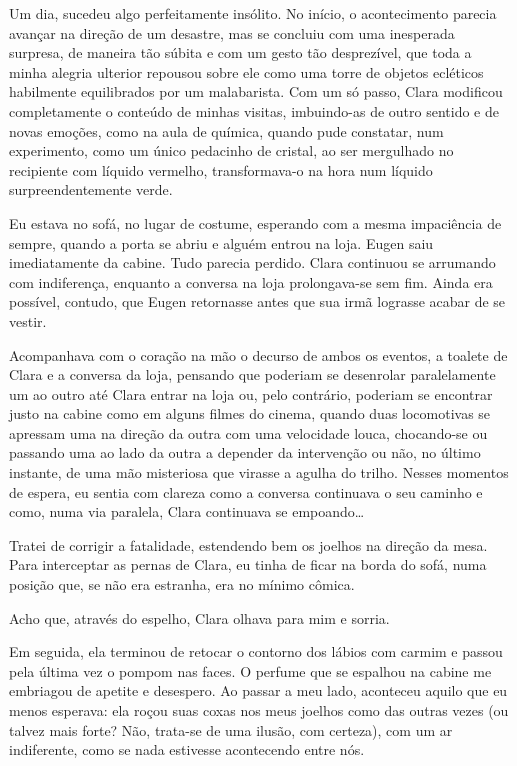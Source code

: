 Um dia, sucedeu algo perfeitamente insólito. No início, o acontecimento
parecia avançar na direção de um desastre, mas se concluiu com uma inesperada
surpresa, de maneira tão súbita e com um gesto tão desprezível, que toda a
minha alegria ulterior repousou sobre ele como uma torre de objetos ecléticos
habilmente equilibrados por um malabarista. Com um só passo, Clara modificou
completamente o conteúdo de minhas visitas, imbuindo-as de outro sentido e de
novas emoções, como na aula de química, quando pude constatar, num
experimento, como um único pedacinho de cristal, ao ser mergulhado no
recipiente com líquido vermelho, transformava-o na hora num líquido
surpreendentemente verde.

Eu estava no sofá, no lugar de costume, esperando com a mesma impaciência de
sempre, quando a porta se abriu e alguém entrou na loja. Eugen saiu
imediatamente da cabine. Tudo parecia perdido. Clara continuou se arrumando
com indiferença, enquanto a conversa na loja prolongava-se sem fim. Ainda era
possível, contudo, que Eugen retornasse antes que sua irmã lograsse acabar de
se vestir.

Acompanhava com o coração na mão o decurso de ambos os eventos, a toalete de
Clara e a conversa da loja, pensando que poderiam se desenrolar paralelamente
um ao outro até Clara entrar na loja ou, pelo contrário, poderiam se
encontrar justo na cabine como em alguns filmes do cinema, quando duas
locomotivas se apressam uma na direção da outra com uma velocidade louca,
chocando-se ou passando uma ao lado da outra a depender da intervenção ou
não, no último instante, de uma mão misteriosa que virasse a agulha do
trilho. Nesses momentos de espera, eu sentia com clareza como a conversa
continuava o seu caminho e como, numa via paralela, Clara continuava se
empoando\ldots{}

Tratei de corrigir a fatalidade, estendendo bem os joelhos na direção da mesa.
Para interceptar as pernas de Clara, eu tinha de ficar na borda do sofá, numa
posição que, se não era estranha, era no mínimo cômica.

Acho que, através do espelho, Clara olhava para mim e sorria.

Em seguida, ela terminou de retocar o contorno dos lábios com carmim e passou
pela última vez o pompom nas faces. O perfume que se espalhou na cabine me
embriagou de apetite e desespero. Ao passar a meu lado, aconteceu aquilo que
eu menos esperava: ela roçou suas coxas nos meus joelhos como das outras
vezes (ou talvez mais forte? Não, trata-se de uma ilusão, com certeza), com
um ar indiferente, como se nada estivesse acontecendo entre nós.

